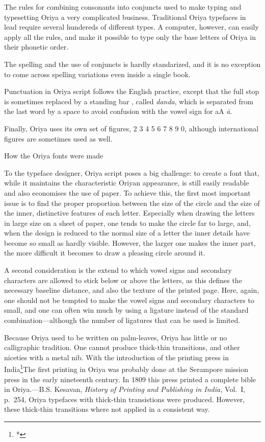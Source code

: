 The rules for combining consonants into conjuncts used to make typing and typesetting
Oriya a very complicated business.
Traditional Oriya typefaces in lead require several hundereds of different types.
A computer, however, can easily apply all the rules, and
make it possible to type only the base letters of Oriya in their phonetic order.

The spelling and the use of conjuncts is hardly standarized, and it is no exception
to come across spelling variations even inside a single book.

Punctuation in Oriya script follows the English practice, except that
the full stop is sometimes replaced by a standing bar {\or\ordanda}, called
{\it danda}, which is separated from the last word by a space to avoid
confusion with the vowel sign for {\or aA} {\it \=a}.

Finally, Oriya uses its own set of figures, { 2 3 4 5 6 7 8 9 0}, although
international figures are sometimes used as well.


\beginsection How the Oriya fonts were made

To the typeface designer, Oriya script poses
a big challenge: to create a font that, while it maintains the
characteristic Oriyan appearance, is still easily readable and also economises the
use of paper. To achieve this, the first most important issue is to find
the proper proportion between the size of the circle and the size of the
inner, distinctive features of each letter. Especially when drawing the
letters
in large size on a sheet of paper, one tends to make the circle far to
large, and, when the design is reduced to the normal size of a letter
the inner details have become so small as hardly visible. However,
the larger one makes the inner part, the more difficult it becomes
to draw a pleasing circle around it.

A second consideration
is the extend to which vowel signs and secondary characters are allowed to
stick below or above the letters, as this defines the necessary 
baseline distance, and also the texture of the printed page. Here, again,
one should not be tempted to make the vowel signs and secondary
characters to small, and one can often win much by using a ligature
instead of the standard combination---although the number of ligatures
that can be used is limited.

Because Oriya used to be written on palm-leaves, Oriya has little or no calligraphic
tradition. One cannot produce thick-thin transitions, and other niceties with
a metal nib. With the introduction of the printing press in India\footnote{*}{The first
printing in Oriya was probably done at the Serampore mission press in the early
nineteenth century. In 1809 this press printed a complete bible in Oriya.---B.S. Kesavan,
{\it History of Printing and Publishing in India,} Vol.~I, p.~254}, Oriya
typefaces with thick-thin transistions were produced. However, these
thick-thin transitions where not applied in a consistent way.

